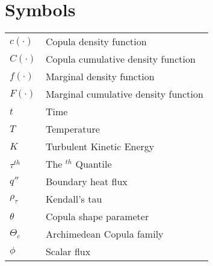 \section*{Symbols}
\begin{tabular}{l l}
$c(\cdot)$ & Copula density function \\
$C(\cdot)$ & Copula cumulative density function \\
$f(\cdot)$ & Marginal density function \\
$F(\cdot)$ & Marginal cumulative density function \\
$t$ & Time \\
$T$ & Temperature \\
$K$ & Turbulent Kinetic Energy \\
$\tau^{th}$ & The $^{th}$ Quantile \\
$q''$ & Boundary heat flux \\
$\rho_{\tau}$ & Kendall's tau \\
$\theta$ & Copula shape parameter \\
$\Theta_c$ & Archimedean Copula family \\
$\phi$ & Scalar flux \\
\end{tabular}

\pagebreak
